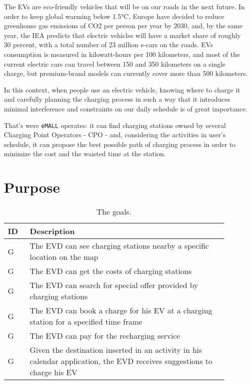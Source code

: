 The EVs are eco-friendly vehicles that will be on our roads in the next future.
In order to keep global warming below 1.5°C, Europe have decided to reduce greenhouse gas emissions of CO2 per
person per year by 2030, and, by the same year, the IEA predicts that electric vehicles will have a market share
of roughly 30 percent, with a total number of 23 million e-cars on the roads.
EVs consumption is measured in kilowatt-hours per 100 kilometers, and most of the current electric cars can travel
between 150 and 350 kilometers on a single charge, but premium-brand models can currently cover more than 500
kilometers.

In this context, when people use an electric vehicle, knowing where to charge it and carefully planning the
charging process in such a way that it introduces minimal interference and constraints on our daily schedule
is of great importance.

That's were \verb|eMALL| operates: it can find charging stations owned by several Charging Point Operators - CPO - and,
considering the activities in user's schedule, it can propose the best possible path of charging process
in order to minimize the cost and the waisted time at the station.


\section{Purpose}
\label{sec:purpose}
\setcounter{g}{1}
\newcommand{\cg}{\theg\stepcounter{g}}
\begin{table}[H]
    \centering
    \begin{tabular}{ |l|p{0.9\linewidth}| }
        \hline
        \textbf{ID} & \textbf{Description}                                                                                                     \\
        \hline
        G\cg        & The EVD can see charging stations nearby a specific location on the map                                                  \\
        \hline
        G\cg        & The EVD can get the costs of charging stations                                                                           \\
        \hline
        G\cg        & The EVD can search for special offer provided by charging stations                                                       \\
        \hline
        G\cg        & The EVD can book a charge for his EV at a charging station for a specified time frame                                    \\
        \hline
        G\cg        & The EVD can pay for the recharging service                                                                               \\
        \hline
        G\cg        & Given the destination inserted in an activity in his calendar application, the EVD receives suggestions to charge his EV \\ %
        \hline
    \end{tabular}
    \caption{The goals.}
    \label{tab:goals_tab}
\end{table}


